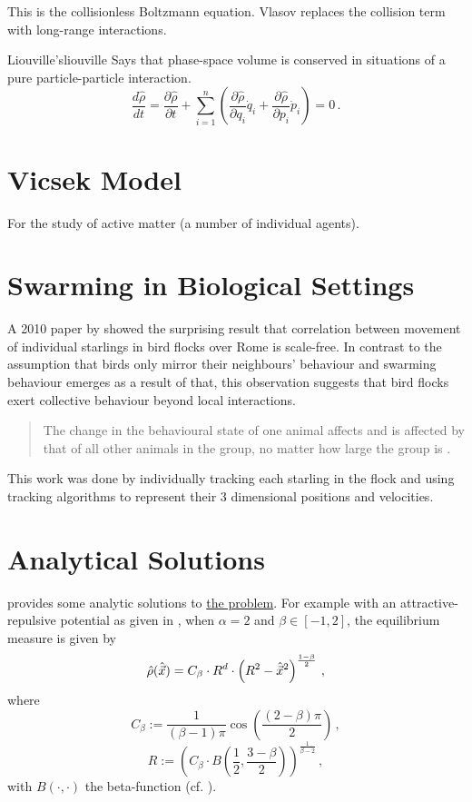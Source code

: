 This is the collisionless Boltzmann equation.
Vlasov replaces the collision term with long-range interactions.

\begin{theorem}{Liouville's}{liouville}
  Says that phase-space volume is conserved in situations of a pure particle-particle interaction.
  $$\frac{d\hat{\rho}}{dt}=
    \frac{\partial\hat{\rho}}{\partial t}
    +\sum_{i=1}^n\left(\frac{\partial\hat{\rho}}{\partial q_i}\dot{q}_i
    +\frac{\partial\hat{\rho}}{\partial p_i}\dot{p}_i\right)=0\,.$$
\end{theorem}

\section{Vicsek Model}
For the study of active matter (a number of individual agents).
\hierKoennteIhreWerbungStehen

\section{Swarming in Biological Settings}
A 2010 paper by \citeauthor{2010-starlings} showed the surprising result that correlation between movement of individual starlings in bird flocks over Rome is scale-free.
In contrast to the assumption that birds only mirror their neighbours' behaviour and swarming behaviour emerges as a result of that, this observation suggests that bird flocks exert collective behaviour beyond local interactions.
\begin{quote}
  The change in the behavioural state of one animal affects and is affected by that of all other animals in the group, no matter how large the group is
  \parencite{2010-starlings}.
\end{quote}
This work was done by individually tracking each starling in the flock and using tracking algorithms to represent their 3 dimensional positions and velocities.

\section{Analytical Solutions}
\label{sec:analytical-solutions}
\cite{2017-explicit-solutions} provides some analytic solutions to \hyperref[def:the-problem]{the problem}.
For example with an attractive-repulsive potential as given in , when $\alpha = 2$ and $\beta \in [-1, 2]$, the equilibrium measure is given by
\begin{equation}
  \hat{\rho}(\hat{\vec{x}}) = C_\beta \cdot R^d \cdot \left(R^2 - \hat{\vec{x}}^2\right)^{\frac{1-\beta}{2}}\,,
  \label{eq:analytical-solution-alpha-equal-2}
\end{equation}
where
$$C_\beta := \frac{1}{(\beta - 1) \pi} \cos\left(\frac{(2 - \beta) \pi}{2}\right)\,,$$
$$R := \left(C_\beta \cdot B\left(\frac{1}{2}, \frac{3 - \beta}{2}\right)\right)^{\frac{1}{\beta - 2}}\,,$$
with $B(\cdot, \cdot)$ the beta-function (cf. ).


